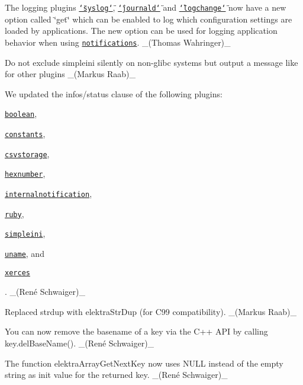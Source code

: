 \begin{DoxyItemize}
\item The logging plugins \href{https://www.libelektra.org/plugins/syslog}{\tt \char`\"{}syslog\char`\"{}}, \href{https://www.libelektra.org/plugins/journald}{\tt \char`\"{}journald\char`\"{}} and \href{https://www.libelektra.org/plugins/logchange}{\tt \char`\"{}logchange\char`\"{}} now have a new option called \char`\"{}get\char`\"{} which can be enabled to log which configuration settings are loaded by applications. The new option can be used for logging application behavior when using \href{https://www.libelektra.org/tutorials/notifications}{\tt notifications}. \+\_\+(\+Thomas Wahringer)\+\_\+
\item Do not exclude {\ttfamily simpleini} silently on non-\/glibc systems but output a message like for other plugins \+\_\+(\+Markus Raab)\+\_\+
\item We updated the {\ttfamily infos/status} clause of the following plugins\+:
\begin{DoxyItemize}
\item \href{http://libelektra.org/plugins/boolean}{\tt {\ttfamily boolean}},
\item \href{http://libelektra.org/plugins/constants}{\tt {\ttfamily constants}},
\item \href{http://libelektra.org/plugins/csvstorage}{\tt {\ttfamily csvstorage}},
\item \href{http://libelektra.org/plugins/hexnumber}{\tt {\ttfamily hexnumber}},
\item \href{http://libelektra.org/plugins/internalnotification}{\tt {\ttfamily internalnotification}},
\item \href{http://libelektra.org/plugins/ruby}{\tt {\ttfamily ruby}},
\item \href{http://libelektra.org/plugins/simpleini}{\tt {\ttfamily simpleini}},
\item \href{http://libelektra.org/plugins/uname}{\tt {\ttfamily uname}}, and
\item \href{http://libelektra.org/plugins/xerces}{\tt {\ttfamily xerces}}
\end{DoxyItemize}

. \+\_\+(René Schwaiger)\+\_\+
\end{DoxyItemize}


\begin{DoxyItemize}
\item Replaced {\ttfamily strdup} with {\ttfamily elektra\+Str\+Dup} (for C99 compatibility). \+\_\+(\+Markus Raab)\+\_\+
\item You can now remove the basename of a key via the C++ A\+PI by calling {\ttfamily key.\+del\+Base\+Name()}. \+\_\+(René Schwaiger)\+\_\+
\item The function {\ttfamily elektra\+Array\+Get\+Next\+Key} now uses {\ttfamily N\+U\+LL} instead of the empty string as init value for the returned key. \+\_\+(René Schwaiger)\+\_\+
\end{DoxyItemize}


